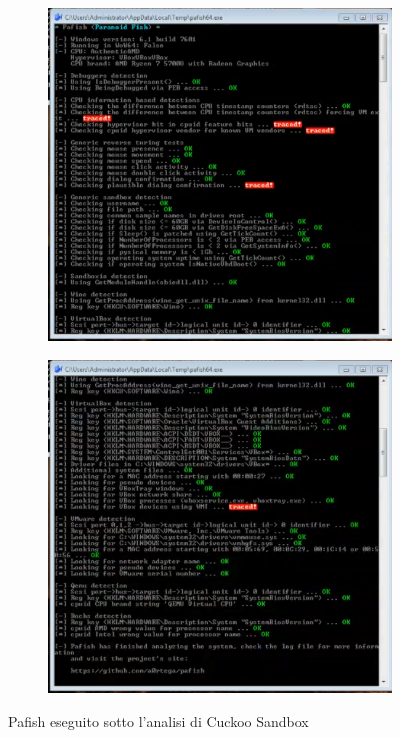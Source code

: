 \begin{figure}[htbp]
\centering
\begin{subfigure}{.5\textwidth}
  \centering
  \includegraphics[width=\linewidth]{assets/pafish_cuckoo_1.png}
\end{subfigure}%
\begin{subfigure}{.5\textwidth}
  \centering
  \includegraphics[width=\linewidth]{assets/pafish_cuckoo_2.png}
\end{subfigure}
\caption{Pafish eseguito sotto l'analisi di Cuckoo Sandbox}
\label{fig:pafish_cuckoo}
\end{figure}

